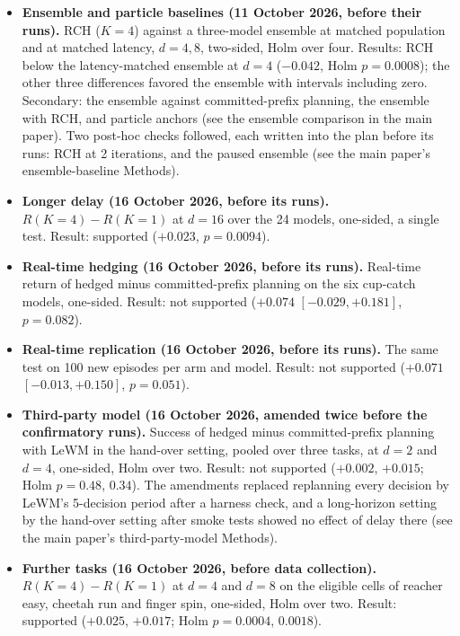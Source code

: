 \begin{itemize}
\begin{itemize}
\item C3: hand-off vs risk penalty. Result: not supported ($-0.011$, $+0.006$).
\item C4: full variant (learned model with hand-off penalty) vs committed prefix. Result: not supported ($-0.001$, $+0.026$).
\end{itemize}
Secondary: both hedges beat committed-prefix planning ($+0.025$/$+0.037$ for the bank, $+0.025$/$+0.047$ for the learned model, at $d=4$/$8$).
\item \textbf{Ensemble and particle baselines (11 October 2026, before their runs).} RCH ($K=4$) against a three-model ensemble at matched population and at matched latency, $d=4,8$, two-sided, Holm over four. Results: RCH below the latency-matched ensemble at $d=4$ ($-0.042$, Holm $p=0.0008$); the other three differences favored the ensemble with intervals including zero. Secondary: the ensemble against committed-prefix planning, the ensemble with RCH, and particle anchors (see the ensemble comparison in the main paper). Two post-hoc checks followed, each written into the plan before its runs: RCH at 2 iterations, and the paused ensemble (see the main paper's ensemble-baseline Methods).
\item \textbf{Longer delay (16 October 2026, before its runs).} $R(K=4)-R(K=1)$ at $d=16$ over the 24 models, one-sided, a single test. Result: supported ($+0.023$, $p=0.0094$).
\item \textbf{Real-time hedging (16 October 2026, before its runs).} Real-time return of hedged minus committed-prefix planning on the six cup-catch models, one-sided. Result: not supported ($+0.074$ $[-0.029, +0.181]$, $p=0.082$).
\item \textbf{Real-time replication (16 October 2026, before its runs).} The same test on 100 new episodes per arm and model. Result: not supported ($+0.071$ $[-0.013, +0.150]$, $p=0.051$).
\item \textbf{Third-party model (16 October 2026, amended twice before the confirmatory runs).} Success of hedged minus committed-prefix planning with LeWM in the hand-over setting, pooled over three tasks, at $d=2$ and $d=4$, one-sided, Holm over two. Result: not supported ($+0.002$, $+0.015$; Holm $p=0.48$, $0.34$). The amendments replaced replanning every decision by LeWM's 5-decision period after a harness check, and a long-horizon setting by the hand-over setting after smoke tests showed no effect of delay there (see the main paper's third-party-model Methods).
\item \textbf{Further tasks (16 October 2026, before data collection).} $R(K=4)-R(K=1)$ at $d=4$ and $d=8$ on the eligible cells of reacher easy, cheetah run and finger spin, one-sided, Holm over two. Result: supported ($+0.025$, $+0.017$; Holm $p=0.0004$, $0.0018$).

\end{itemize}
